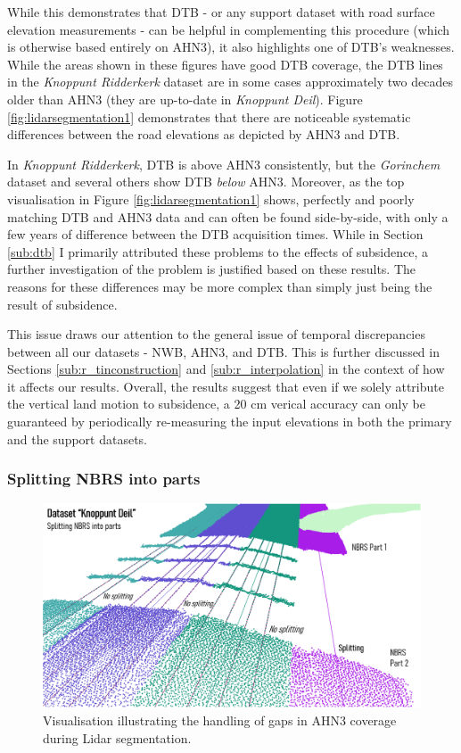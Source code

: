 While this demonstrates that DTB - or any support dataset with road surface elevation measurements - can be helpful in complementing this procedure (which is otherwise based entirely on AHN3), it also highlights one of DTB's weaknesses. While the areas shown in these figures have good DTB coverage, the DTB lines in the \textit{Knoppunt Ridderkerk} dataset are in some cases approximately two decades older than AHN3 (they are up-to-date in \textit{Knoppunt Deil}). Figure \ref{fig:lidarsegmentation1} demonstrates that there are noticeable systematic differences between the road elevations as depicted by AHN3 and DTB.

In \textit{Knoppunt Ridderkerk}, DTB is above AHN3 consistently, but the \textit{Gorinchem} dataset and several others show DTB \textit{below} AHN3. Moreover, as the top visualisation in Figure \ref{fig:lidarsegmentation1} shows, perfectly and poorly matching DTB and AHN3 data and can often be found side-by-side, with only a few years of difference between the DTB acquisition times. While in Section \ref{sub:dtb} I primarily attributed these problems to the effects of subsidence, a further investigation of the problem is justified based on these results. The reasons for these differences may be more complex than simply just being the result of subsidence.

This issue draws our attention to the general issue of temporal discrepancies between all our datasets - NWB, AHN3, and DTB. This is further discussed in Sections \ref{sub:r_tinconstruction} and \ref{sub:r_interpolation} in the context of how it affects our results. Overall, the results suggest that even if we solely attribute the vertical land motion to subsidence, a 20 cm verical accuracy can only be guaranteed by periodically re-measuring the input elevations in both the primary and the support datasets.

\subsubsection{Splitting NBRS into parts}

\begin{figure}
    \centering
    \includegraphics[width=0.86\linewidth]{final_report/figs/lidarsegmentation2.png}
    \caption{Visualisation illustrating the handling of gaps in AHN3 coverage during Lidar segmentation.}
    \label{fig:lidarsegmentation2}
\end{figure}


